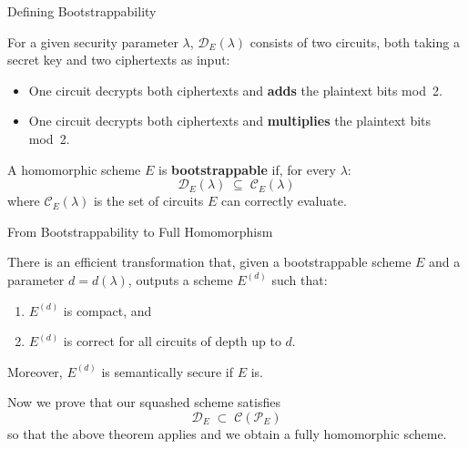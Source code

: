 \documentclass[10pt,handout]{beamer}
\begin{document}
\begin{frame}{Defining Bootstrappability}
    \begin{definition}
    For a given security parameter $\lambda$, $\mathcal{D}_E(\lambda)$
    consists of two circuits, both taking a secret key and two ciphertexts
    as input:    
    \begin{itemize}
        \item One circuit decrypts both ciphertexts and \textbf{adds} the
              plaintext bits mod~2.
        \item One circuit decrypts both ciphertexts and \textbf{multiplies}
              the plaintext bits mod~2.
    \end{itemize}
    \end{definition}

    \vspace{0.3cm}
    \begin{definition}
    A homomorphic scheme $E$ is \textbf{bootstrappable} if, for every $\lambda$:
    \[
        \mathcal{D}_E(\lambda) \;\subseteq\; \mathcal{C}_E(\lambda)
    \]
    where $\mathcal{C}_E(\lambda)$ is the set of circuits $E$ can correctly
    evaluate.
    \end{definition}
\end{frame}

\begin{frame}{From Bootstrappability to Full Homomorphism}
    \begin{theorem}[Gentry 2009]
    There is an efficient transformation that, given a bootstrappable scheme
    $E$ and a parameter $d = d(\lambda)$, outputs a scheme $E^{(d)}$ such
    that:
    \begin{enumerate}
        \item $E^{(d)}$ is compact, and
        \item $E^{(d)}$ is correct for all circuits of depth up to $d$.
    \end{enumerate}
    Moreover, $E^{(d)}$ is semantically secure if $E$ is.
    \end{theorem}

    \vspace{0.4cm}

    Now we prove that our squashed scheme satisfies
    \[
        \mathcal{D}_E \;\subset\; \mathcal{C}(\mathcal{P}_E)
    \]
    so that the above theorem applies and we obtain a fully homomorphic scheme.
\end{frame}
\end{document}
